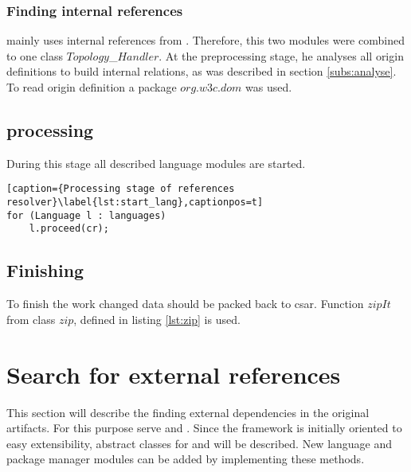 \subsubsection*{Finding internal references}\label{subs:imp_findintref}
 mainly uses internal references from .
Therefore, this two modules were combined to one class $Topology$\_$Handler$.	
At the preprocessing stage, he analyses all origin definitions to build internal relations, as was described in section \ref{subs:analyse}.
To read origin definition a package $org$.$w3c$.$dom$ was used.

\subsection*{processing}
During this stage all described language modules are started.
\begin{lstlisting}[caption={Processing stage of references resolver}\label{lst:start_lang},captionpos=t] 
for (Language l : languages)
	l.proceed(cr);
\end{lstlisting}


\subsection*{Finishing}
To finish the work changed data should be packed back to \gls{csar}.
Function $zipIt$ from class $zip$, defined in listing \ref{lst:zip} is used.


\section{Search for external references}
This section will describe the finding external dependencies in the original artifacts.
For this purpose serve  and .
Since the framework is initially oriented to easy extensibility, abstract classes for  and  will be described.
New language and package manager modules can be added by implementing these methods.

